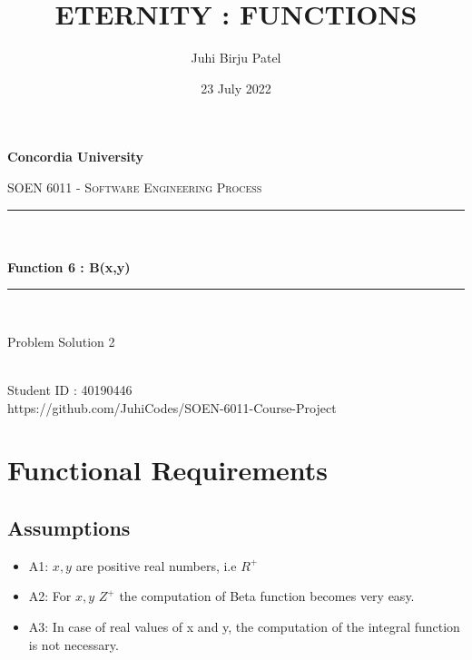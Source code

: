 \documentclass[12pt]{report}
\title{ETERNITY : FUNCTIONS}
\author{Juhi Birju Patel}
\date{23 July 2022}
\makeatletter
\let\thetitle\@title
\let\theauthor\@author
\makeatother
\begin{document}
\begin{titlepage}
	\centering
    \vspace*{0.5 cm}
\begin{center}    \textbf{\Large Concordia University}\\[2.0 cm]	\end{center}
	\textsc{\Large  SOEN 6011 - Software Engineering Process }\\[0.5 cm]
	\rule{\linewidth}{0.2 mm} \\[0.4 cm]
	{ \huge \textbf \thetitle}\\[0.2 cm]
	{ \huge \textbf{ Function 6 : B(x,y)}}
	\rule{\linewidth}{0.2 mm} \\[1.5 cm]

\begin{center}   {\Large Problem Solution 2}\\[2.0 cm]
\end{center}	
\begin{center}   {\Large \textbf{\theauthor}} \\[0.2 cm]
                 {\large Student ID : 40190446 }\\[0.2 cm]
                 {\large https://github.com/JuhiCodes/SOEN-6011-Course-Project}
\end{center}
	
\end{titlepage}

\tableofcontents
\pagebreak
\renewcommand{\thesection}{\arabic{section}}
\newpage
\section{Functional Requirements}
\subsection{Assumptions}
\begin{itemize}
\item A1: $x,y$ are positive real numbers, i.e $R^+$
\end{itemize}
\begin{itemize}
\item A2: For $x,y$ \in $ Z^+ $ the computation of Beta function becomes very easy. 
\end{itemize}
\begin{itemize}
\item A3: In case of real values of x and y, the computation of the integral function is not necessary.
\end{itemize}
\end{document}
